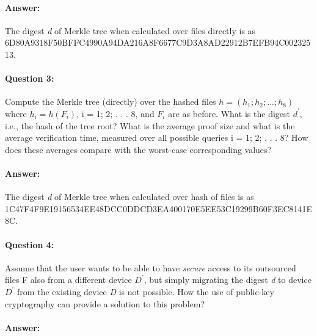 \documentclass{article}
\begin{document}
    \paragraph{Answer:\newline}
        The digest \emph{d} of Merkle tree when calculated over files directly is as \newline 6D80A9318F50BFFC4990A94DA216A8F6677C9D3A8AD22912B7EFB94C00232513.
        
    \paragraph{Question 3:} Compute the Merkle tree (directly) over the hashed files $h = (h_1; h_2; . . . ; h_8)$ where $h_i = h(F_i)$, i = 1; 2; . . . 8, and $F_i$ are as before. What is the digest $d^\prime$, i.e., the hash of the tree root? What is the average proof size and what is the average verification time, measured over all possible queries i = 1; 2; . . . 8? How does these averages compare with the worst-case corresponding values?
    \paragraph{Answer:\newline}
        The digest \emph{d} of Merkle tree when calculated over hash of files is as \newline 1C47F4F9E19156534EE48DCC0DDCD3EA400170E5EE53C19299B60F3EC8141E8C. 
    
    
    \paragraph{Question 4:} Assume that the user wants to be able to have \emph{secure} access to its outsourced files F also from a different device $D^\prime$, but simply migrating the digest \emph{d} to device $D^\prime$ from the existing device \emph{D} is not possible. How the use of public-key cryptography can provide a solution to this problem?
    \paragraph{Answer:\newline}
    


\end{document}
